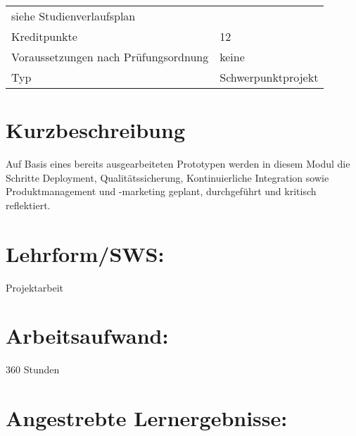\begin{longtable}[]{@{}ll@{}}
\begin{minipage}[t]{0.12\columnwidth}
siehe Studienverlaufsplan\strut
\end{minipage}\tabularnewline
\begin{minipage}[t]{0.12\columnwidth}\raggedright\strut
Kreditpunkte\strut
\end{minipage} & \begin{minipage}[t]{0.12\columnwidth}\raggedright\strut
12\strut
\end{minipage}\tabularnewline
\begin{minipage}[t]{0.12\columnwidth}\raggedright\strut
Voraussetzungen nach Prüfungsordnung\strut
\end{minipage} & \begin{minipage}[t]{0.12\columnwidth}\raggedright\strut
keine\strut
\end{minipage}\tabularnewline
\begin{minipage}[t]{0.12\columnwidth}\raggedright\strut
Typ\strut
\end{minipage} & \begin{minipage}[t]{0.12\columnwidth}\raggedright\strut
Schwerpunktprojekt\strut
\end{minipage}\tabularnewline
\bottomrule
\end{longtable}

\section*{Kurzbeschreibung}\label{kurzbeschreibung-9}

Auf Basis eines bereits ausgearbeiteten Prototypen werden in diesem
Modul die Schritte Deployment, Qualitätssicherung, Kontinuierliche
Integration sowie Produktmanagement und -marketing geplant, durchgeführt
und kritisch reflektiert.

\section*{Lehrform/SWS:}\label{lehrformsws-15}

Projektarbeit

\section*{Arbeitsaufwand:}\label{arbeitsaufwand-15}

360 Stunden

\section*{Angestrebte
Lernergebnisse:}\label{angestrebte-lernergebnisse-15}

